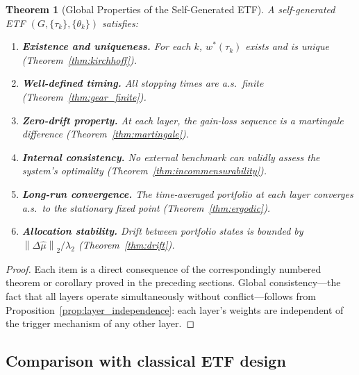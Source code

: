 \documentclass[twocolumn,11pt,a4paper]{article}
\theoremstyle{plain}
\newtheorem{theorem}{Theorem}[section]
\theoremstyle{definition}
\theoremstyle{remark}
\newcommand{\wstar}{w^{*}}
\newcommand{\lamtwo}{\lambda_2}
\newcommand{\norm}[1]{\left\|#1\right\|}
\begin{document}
\begin{theorem}[Global Properties of the Self-Generated ETF]
  \label{thm:global}
  A self-generated ETF $(G,\{\tau_k\},\{\theta_k\})$ satisfies:
  \begin{enumerate}[label=(\alph*)]
    \item\label{it:global_exist}
      \textbf{Existence and uniqueness.}  For each $k$, $\wstar(\tau_k)$
      exists and is unique (Theorem~\ref{thm:kirchhoff}).

    \item\label{it:global_finite}
      \textbf{Well-defined timing.}  All stopping times are a.s.~finite
      (Theorem~\ref{thm:gear_finite}).

    \item\label{it:global_mds}
      \textbf{Zero-drift property.}  At each layer, the gain-loss
      sequence is a martingale difference (Theorem~\ref{thm:martingale}).

    \item\label{it:global_incomm}
      \textbf{Internal consistency.}  No external benchmark can
      validly assess the system's optimality
      (Theorem~\ref{thm:incommensurability}).

    \item\label{it:global_ergodic}
      \textbf{Long-run convergence.}  The time-averaged portfolio at
      each layer converges a.s.~to the stationary fixed point
      (Theorem~\ref{thm:ergodic}).

    \item\label{it:global_drift}
      \textbf{Allocation stability.}  Drift between portfolio states
      is bounded by $\norm{\Delta\hat\mu}_2/\lamtwo$
      (Theorem~\ref{thm:drift}).
  \end{enumerate}
\end{theorem}

\begin{proof}
  Each item is a direct consequence of the correspondingly numbered
  theorem or corollary proved in the preceding sections.  Global
  consistency---the fact that all layers operate simultaneously
  without conflict---follows from Proposition~\ref{prop:layer_independence}:
  each layer's weights are independent of the trigger mechanism of any
  other layer.
\end{proof}

\subsection{Comparison with classical ETF design}
\label{sec:comparison}
\end{document}
